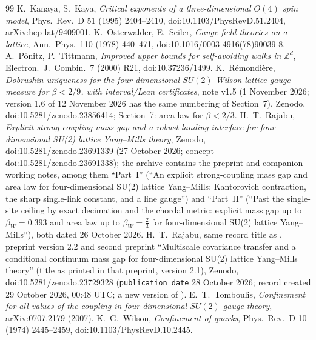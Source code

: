 \documentclass[11pt,a4paper]{article}
\theoremstyle{plain}
\theoremstyle{remark}
\numberwithin{equation}{section}
\newcommand{\Z}{\mathbb{Z}}
\begin{document}
\begin{thebibliography}{99}
 K.~Kanaya, S.~Kaya, \emph{Critical exponents of a three-dimensional $O(4)$ spin model}, Phys.\ Rev.\ D 51 (1995)
2404--2410, doi:10.1103/PhysRevD.51.2404, arXiv:hep-lat/9409001.
 K.~Osterwalder, E.~Seiler, \emph{Gauge field theories on a lattice}, Ann.\ Phys.\ 110 (1978) 440--471,
doi:10.1016/0003-4916(78)90039-8.
 A.~P\"onitz, P.~Tittmann, \emph{Improved upper bounds for self-avoiding walks in $\Z^d$}, Electron.\ J.\ Combin.\ 7
(2000) R21, doi:10.37236/1499.
 K.~R\'emondi\`ere, \emph{Dobrushin uniqueness for the four-dimensional $SU(2)$ Wilson lattice gauge measure for
$\beta<2/9$, with interval/Lean certificates}, note v1.5 (1 November 2026; version 1.6 of 12 November 2026 has the same numbering of Section~7), Zenodo, doi:10.5281/zenodo.23856414; Section~7: area law
for $\beta<2/3$.
 H.~T.~Rajabu, \emph{Explicit strong-coupling mass gap and a robust landing interface for four-dimensional SU(2) lattice Yang--Mills theory}, Zenodo, doi:10.5281/zenodo.23691339 (27 October 2026; concept doi:10.5281/zenodo.23691338); the archive contains the preprint and companion working notes, among them ``Part~I'' (``An explicit strong-coupling mass gap and area law for four-dimensional SU(2) lattice Yang--Mills: Kantorovich contraction, the sharp single-link constant, and a line gauge'') and ``Part~II'' (``Past the single-site ceiling by exact decimation and the chordal metric: explicit mass gap up to $\beta_W=0.393$ and area law up to $\beta_W=\frac23$ for four-dimensional SU(2) lattice Yang--Mills''), both dated 26 October 2026.
 H.~T.~Rajabu, same record title as \cite{Raj26a}, preprint version 2.2 and second preprint ``Multiscale covariance transfer and a conditional continuum mass gap for four-dimensional SU(2) lattice Yang--Mills theory'' (title as printed in that preprint, version 2.1), Zenodo, doi:10.5281/zenodo.23729328 (\texttt{publication\_date} 28 October 2026; record created 29 October 2026, 00:48 UTC; a new version of \cite{Raj26a}).
 E.~T.~Tomboulis, \emph{Confinement for all values of the coupling in four-dimensional $SU(2)$ gauge theory},
arXiv:0707.2179 (2007).
 K.~G.~Wilson, \emph{Confinement of quarks}, Phys.\ Rev.\ D 10 (1974) 2445--2459, doi:10.1103/PhysRevD.10.2445.
\end{thebibliography}
\end{document}
